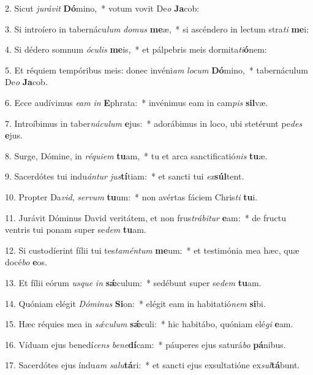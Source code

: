 2. Sicut \textit{ju}\textit{rá}\textit{vit} \textbf{Dó}mino,~*  votum vovit De\textit{o} \textbf{Ja}cob:\

3. Si introíero in tabernácu\textit{lum} \textit{do}\textit{mus} \textbf{me}æ,~*  si ascéndero in lectum stra\textit{ti} \textbf{me}i:\

4. Si dédero somnum \textit{ó}\textit{cu}\textit{lis} \textbf{me}is,~*  et pálpebris meis dormita\textit{ti}\textbf{ó}nem:\

5. Et réquiem tempóribus meis: donec invéni\textit{am} \textit{lo}\textit{cum} \textbf{Dó}mino,~*  tabernáculum De\textit{o} \textbf{Ja}cob.\

6. Ecce audívimus \textit{e}\textit{am} \textit{in} \textbf{E}phrata:~*  invénimus eam in cam\textit{pis} \textbf{sil}væ.\

7. Introíbimus in taber\textit{ná}\textit{cu}\textit{lum} \textbf{e}jus:~*  adorábimus in loco, ubi stetérunt pe\textit{des} \textbf{e}jus.\

8. Surge, Dómine, in \textit{ré}\textit{qui}\textit{em} \textbf{tu}am,~*  tu et arca sanctificatió\textit{nis} \textbf{tu}æ.\

9. Sacerdótes tui indu\textit{án}\textit{tur} \textit{jus}\textbf{tí}tiam:~*  et sancti tui \textit{ex}\textbf{súl}tent.\

10. Propter Da\textit{vid}, \textit{ser}\textit{vum} \textbf{tu}um:~*  non avértas fáciem Chris\textit{ti} \textbf{tu}i.\

11. Jurávit Dóminus David veritátem, et non frus\textit{trá}\textit{bi}\textit{tur} \textbf{e}am:~*  de fructu ventris tui ponam super se\textit{dem} \textbf{tu}am.\

12. Si custodíerint fílii tui tes\textit{ta}\textit{mén}\textit{tum} \textbf{me}um:~*  et testimónia mea hæc, quæ docé\textit{bo} \textbf{e}os.\

13. Et fílii eórum \textit{us}\textit{que} \textit{in} \textbf{sǽ}culum:~*  sedébunt super se\textit{dem} \textbf{tu}am.\

14. Quóniam elégit \textit{Dó}\textit{mi}\textit{nus} \textbf{Si}on:~*  elégit eam in habitatió\textit{nem} \textbf{si}bi.\

15. Hæc réquies mea in \textit{sǽ}\textit{cu}\textit{lum} \textbf{sǽ}culi:~*  hic habitábo, quóniam elé\textit{gi} \textbf{e}am.\

16. Víduam ejus benedí\textit{cens} \textit{be}\textit{ne}\textbf{dí}cam:~*  páuperes ejus saturá\textit{bo} \textbf{pá}nibus.\

17. Sacerdótes ejus índu\textit{am} \textit{sa}\textit{lu}\textbf{tá}ri:~*  et sancti ejus exsultatióne ex\textit{sul}\textbf{tá}bunt.\

